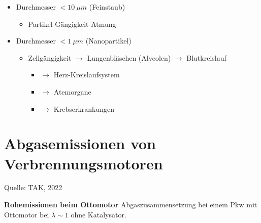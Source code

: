 \begin{itemize}
\item
  Durchmesser $< 10~\mu m$ (Feinstaub)

  \begin{itemize}
  \item
    Partikel-Gängigkeit Atmung
  \end{itemize}
\item
  Durchmesser $< 1~\mu m$ (Nanopartikel)

  \begin{itemize}
  \item
    Zellgängigkeit $\to$ Lungenbläschen (Alveolen) $\to$
    Blutkreislauf

    \begin{itemize}
    \item
      $\to$ Herz-Kreislaufsystem
    \item
      $\to$ Atemorgane
    \item
      $\to$ Krebserkrankungen
    \end{itemize}
  \end{itemize}
\end{itemize}

\section{Abgasemissionen von
Verbrennungsmotoren}\label{abgasemissionen-von-verbrennungsmotoren}

Quelle: TAK, 2022

\textbf{Rohemissionen beim Ottomotor} Abgaszusammensetzung bei einem Pkw
mit Ottomotor bei $\lambda \sim 1$ ohne Katalysator.

